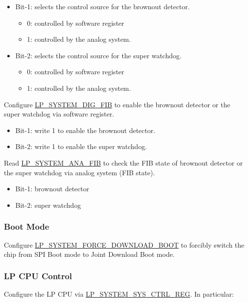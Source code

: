 \documentclass[main\_\_EN.tex]{subfiles}
\begin{document}
\begin{itemize}
    \item Bit-1: selects the control source for the brownout detector.
    \begin{itemize}
        \item 0: controlled by software register
        \item 1: controlled by the analog system.
    \end{itemize}
    \item Bit-2: selects the control source for the super watchdog.
        \begin{itemize}
            \item 0: controlled by software register
            \item 1: controlled by the analog system.
        \end{itemize}
\end{itemize}

Configure \hyperref[fielddesc:LPSYSTEMDIGFIB]{LP\_SYSTEM\_DIG\_FIB} to enable the brownout detector or the super watchdog via software register.
\begin{itemize}
    \item Bit-1: write 1 to enable the brownout detector.
    \item Bit-2: write 1 to enable the super watchdog.
\end{itemize}

Read \hyperref[fielddesc:LPSYSTEMANAFIB]{LP\_SYSTEM\_ANA\_FIB} to check the FIB state of brownout detector or the super watchdog via analog system (FIB state).
\begin{itemize}
    \item Bit-1: brownout detector
    \item Bit-2: super watchdog
\end{itemize}

\subsubsection{Boot Mode}

Configure \hyperref[fielddesc:LPSYSTEMFORCEDOWNLOADBOOT]{LP\_SYSTEM\_FORCE\_DOWNLOAD\_BOOT} to forcibly switch the chip from SPI Boot mode to Joint Download Boot mode.

\subsubsection{LP CPU Control}

Configure the LP CPU via \hyperref[regdesc:LPSYSTEMSYSCTRLREG]{LP\_SYSTEM\_SYS\_CTRL\_REG}. In particular:
\end{document}
